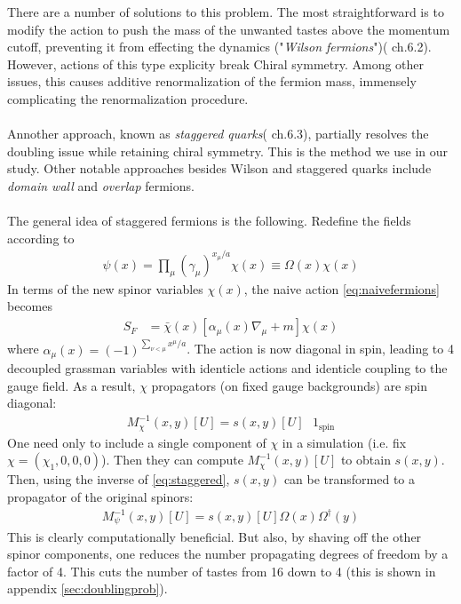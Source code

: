 There are a number of solutions to this problem. The most straightforward is to modify the action to push the mass of the unwanted tastes above the momentum cutoff, preventing it from effecting the dynamics ("\textit{Wilson fermions}")(\cite{DeGrand:2006zz} ch.6.2). However, actions of this type explicity break Chiral symmetry. Among other issues, this causes additive renormalization of the fermion mass, immensely complicating the renormalization procedure.
\\ \\
Annother approach, known as \textit{staggered quarks}(\cite{DeGrand:2006zz} ch.6.3), partially resolves the doubling issue while retaining chiral symmetry. This is the method we use in our study. Other notable approaches besides Wilson and staggered quarks include \textit{domain wall} \cite{Jansen:1994ym} and \textit{overlap} \cite{Narayanan:2011qj} fermions.
\\ \\
The general idea of staggered fermions is the following.
Redefine the fields according to
\begin{align}
 \psi(x) = \prod_{\mu}(\gamma_{\mu})^{x_{\mu}/a} \chi(x) \equiv \Omega(x) \chi(x)
 \label{eq:staggered}
\end{align}
In terms of the new spinor variables $\chi(x)$, the naive action \eqref{eq:naivefermions} becomes
\begin{align}
  S_F &= \bar{\chi}(x)[\alpha_{\mu}(x) \nabla_{\mu} + m ] \chi(x)
\end{align}
where $\alpha_{\mu}(x) = (-1)^{\sum_{\nu < \mu} x^{\mu}/a}$. The action is now diagonal in spin, leading to 4 decoupled grassman variables with identicle actions and identicle coupling to the gauge field. As a result, $\chi$ propagators (on fixed gauge backgrounds) are spin diagonal:
\begin{align}
	M^{-1}_{\chi}(x,y)[U] = s(x,y)[U] \text{ } 1_{\text{spin}}
\end{align}
One need only to include a single component of $\chi$ in a simulation (i.e. fix $\chi = (\chi_1,0,0,0)$). Then they can compute $M^{-1}_{\chi}(x,y)[U]$ to obtain $s(x,y)$. Then, using the inverse of \eqref{eq:staggered}, $s(x,y)$ can be transformed to a propagator of the original spinors:
\begin{align}
	M_{\psi}^{-1}(x,y)[U] = s(x,y)[U] \Omega(x) \Omega^{\dagger}(y)
\end{align}
This is clearly computationally beneficial. But also, by shaving off the other spinor components, one reduces the number propagating degrees of freedom by a factor of 4. This cuts the number of tastes from 16 down to 4 (this is shown in appendix \ref{sec:doublingprob}).
